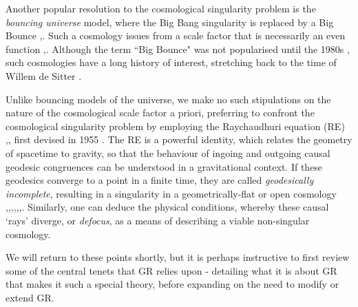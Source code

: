 Another popular resolution to the cosmological singularity problem is the \emph{bouncing universe} model, where the Big Bang singularity is replaced by a Big Bounce \cite{Novello:2008ra},\cite{Bozza:2005qg}. Such a cosmology issues from a scale factor that is necessarily an even function \cite{Calcagni:2013vra},\cite{Martin:2004qj}. Although the term ``Big Bounce" was not popularised until the 1980s \cite{Overduin:2006hb}, such cosmologies have a long history of interest, stretching back to the time of Willem de Sitter \cite{anderson2015cosmic}. 

Unlike bouncing models of the universe, we make no such stipulations on the nature of the cosmological scale factor a priori, preferring to confront the cosmological singularity problem by employing the Raychaudhuri equation (RE) \cite{Raych},\cite{ellis2012relativistic}, first devised in 1955 \cite{Senovilla:2014gza}. The RE is a powerful identity, which relates the geometry of spacetime to gravity, so that the behaviour of ingoing and outgoing causal geodesic congruences can be understood in a gravitational context. If these geodesics converge to a point in a finite time, they are called \emph{geodesically incomplete}, resulting in a singularity in a geometrically-flat or open cosmology \cite{Hawking:1973uf},\cite{Ellis:2003mb},\cite{Kar:2006ms},\cite{Wald:GR},\cite{Borde:1996pt},\cite{Borde:2001nh},\cite{Joshi:2013xoa}. Similarly, one can deduce the physical conditions, whereby these causal `rays' diverge, or \emph{defocus}, as a means of describing a viable non-singular cosmology. 

We will return to these points shortly, but it is perhaps instructive to first review some of the central tenets that GR relies upon - detailing what it is about GR that makes it such a special theory, before expanding on the need to modify or extend GR.
